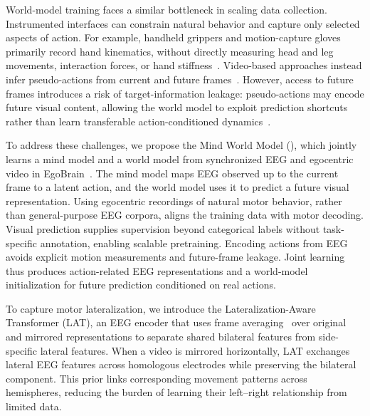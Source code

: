 World-model training faces a similar bottleneck in scaling data collection. Instrumented interfaces can constrain natural behavior and capture only selected aspects of action. For example, handheld grippers and motion-capture gloves primarily record hand kinematics, without directly measuring head and leg movements, interaction forces, or hand stiffness~\citep{chi2024umi,wang2024dexcap}. Video-based approaches instead infer pseudo-actions from current and future frames~\citep{bruce2024genie,gao2025adaworld}. However, access to future frames introduces a risk of target-information leakage: pseudo-actions may encode future visual content, allowing the world model to exploit prediction shortcuts rather than learn transferable action-conditioned dynamics~\citep{garrido2026lawm}.

To address these challenges, we propose the Mind World Model (\mwm{}), which jointly learns a mind model and a world model from synchronized EEG and egocentric video in EgoBrain~\citep{lin2026egobrain}. The mind model maps EEG observed up to the current frame to a latent action, and the world model uses it to predict a future visual representation. Using egocentric recordings of natural motor behavior, rather than general-purpose EEG corpora, aligns the training data with motor decoding. Visual prediction supplies supervision beyond categorical labels without task-specific annotation, enabling scalable pretraining. Encoding actions from EEG avoids explicit motion measurements and future-frame leakage. Joint learning thus produces action-related EEG representations and a world-model initialization for future prediction conditioned on real actions.

To capture motor lateralization, we introduce the Lateralization-Aware Transformer (LAT), an EEG encoder that uses frame averaging~\citep{puny2022frame} over original and mirrored representations to separate shared bilateral features from side-specific lateral features. When a video is mirrored horizontally, LAT exchanges lateral EEG features across homologous electrodes while preserving the bilateral component. This prior links corresponding movement patterns across hemispheres, reducing the burden of learning their left--right relationship from limited data.

